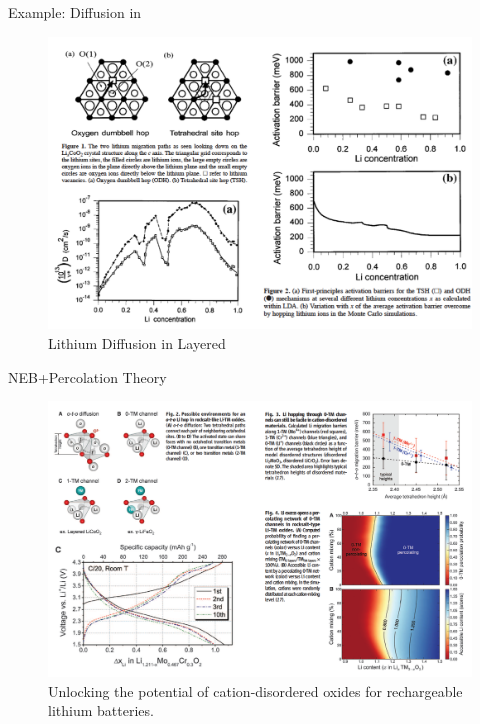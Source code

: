 \documentclass[aspectratio=169]{beamer}
\begin{document}
\begin{frame}{Example: Diffusion in }
\begin{figure}
    \centering
    \includegraphics[width=0.6\linewidth]{lectures/figures/12-LCO_Diffusion.png}
    \caption{Lithium Diffusion in Layered \cite{vandervenLithiumDiffusionLayered2000}}
\end{figure} 
\end{frame} 


\begin{frame}{NEB+Percolation Theory}
\begin{figure}
    \centering
    \includegraphics[width=0.6\linewidth]{lectures/figures/12-Percolation.png}
    \caption{Unlocking the potential of cation-disordered oxides for rechargeable lithium batteries.\cite{leeUnlockingPotentialCationdisordered2014}}
\end{figure} 
\end{frame} 
\end{document}
